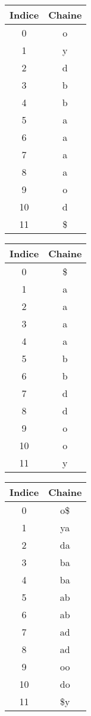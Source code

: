 \begin{tabular}{|c|c|}
    \hline
    Indice & Chaine \\
    \hline
    0 & o\\
    \hline
    1 & y  \\
    \hline
    2 & d\\
    \hline
    3 & b\\
    \hline
    4 & b\\
    \hline
    5 & a\\
    \hline
    6 & a\\
    \hline
    7 & a\\
    \hline
    8 & a\\
    \hline
    9 & o\\
    \hline
    10 & d\\
    \hline
    11 & \$\\
    \hline
\end{tabular}


\begin{tabular}{|c|c|}
    \hline
    Indice & Chaine \\
    \hline
    0 & \$\\
    \hline
    1 & a  \\
    \hline
    2 & a\\
    \hline
    3 & a\\
    \hline
    4 & a\\
    \hline
    5 & b\\
    \hline
    6 & b\\
    \hline
    7 & d\\
    \hline
    8 & d\\
    \hline
    9 & o\\
    \hline
    10 & o\\
    \hline
    11 & y\\
    \hline
\end{tabular}


\begin{tabular}{|c|c|}
    \hline
    Indice & Chaine \\
    \hline
    0 & o\$\\
    \hline
    1 & ya  \\
    \hline
    2 & da\\
    \hline
    3 & ba\\
    \hline
    4 & ba\\
    \hline
    5 & ab\\
    \hline
    6 & ab\\
    \hline
    7 & ad\\
    \hline
    8 & ad\\
    \hline
    9 & oo\\
    \hline
    10 & do\\
    \hline
    11 & \$y\\
    \hline
\end{tabular}

